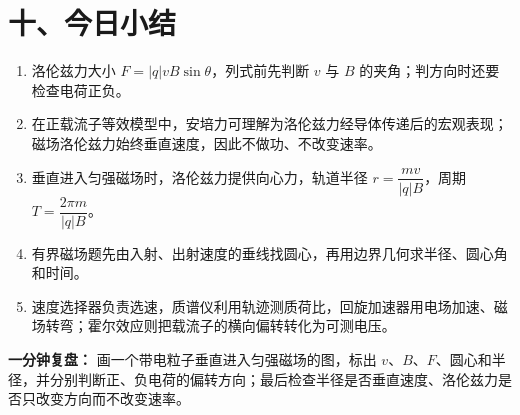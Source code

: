 \section*{十、今日小结}

\begin{enumerate}
  \item 洛伦兹力大小 $F=|q|vB\sin\theta$，列式前先判断 $v$ 与 $B$ 的夹角；判方向时还要检查电荷正负。
  \item 在正载流子等效模型中，安培力可理解为洛伦兹力经导体传递后的宏观表现；磁场洛伦兹力始终垂直速度，因此不做功、不改变速率。
  \item 垂直进入匀强磁场时，洛伦兹力提供向心力，轨道半径 $r=\dfrac{mv}{|q|B}$，周期 $T=\dfrac{2\pi m}{|q|B}$。
  \item 有界磁场题先由入射、出射速度的垂线找圆心，再用边界几何求半径、圆心角和时间。
  \item 速度选择器负责选速，质谱仪利用轨迹测质荷比，回旋加速器用电场加速、磁场转弯；霍尔效应则把载流子的横向偏转转化为可测电压。
\end{enumerate}

\textbf{一分钟复盘：} 画一个带电粒子垂直进入匀强磁场的图，标出 $v$、$B$、$F$、圆心和半径，并分别判断正、负电荷的偏转方向；最后检查半径是否垂直速度、洛伦兹力是否只改变方向而不改变速率。
